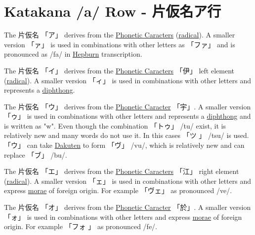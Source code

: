\section{Katakana /a/ Row -  片仮名ア行}\label{sec:KatakanaARow}


\label{letter:a} The 片仮名 {「ア」} derives from the
\hyperref[sec:PhoneticCharacter]{Phonetic Caracters}
(\hyperref[sec:Radical]{radical}).  A smaller version {「ァ」} is used in
combinations with other letters as {「ファ」} and is pronounced as /fa/ in
\hyperref[sec:Hepburn]{Hepburn} transcription.

\label{letter:u} The 片仮名 {「イ」} derives from the
\hyperref[sec:PhoneticCharacter]{Phonetic Caracters} {「伊」} left element
(\hyperref[sec:Radical]{radical}).  A smaller version {「ィ」} is used in
combinations with other letters and represents a
\hyperref[sec:Diphthong]{diphthong}. 

\label{letter:u} The 片仮名 {「ウ」} derives from the
\hyperref[sec:PhoneticCharacter]{Phonetic Caracter} {「宇」}. A smaller version
{「ゥ」} is used in combinations with other letters and represents a
\hyperref[sec:Diphthong]{diphthong} and is written as "w". Even though the
combination {「トゥ」} /tu/ exist, it is relatively new and many words do not
use it. In this cases {「ツ 」} /tsu/ is used. {「ウ」} can take
\hyperref[sec:Dakuten]{Dakuten} to form {「ヴ」} /vu/, which is relatively new
and can replace {「ブ」} /bu/. 



\newpage 

\label{letter:e} The 片仮名 {「エ」} derives from the
\hyperref[sec:PhoneticCharacter]{Phonetic Caracters} {「江」} right element
(\hyperref[sec:Radical]{radical}). A smaller version {「ェ」} is used in
combinations with other letters and express \hyperref[sec:Mora]{morae} of
foreign origin. For example {「ヴェ」} as pronounced /ve/.

\label{letter:o} The 片仮名 {「オ」} derives from the
\hyperref[sec:PhoneticCharacter]{Phonetic Caracter} {「於」}. A smaller version
{「ォ」} is used in combinations with other letters and express
\hyperref[sec:Mora]{morae} of foreign origin. For example {「フォ 」} as
pronounced /fe/.

\newpage

